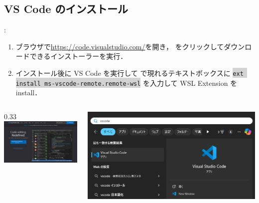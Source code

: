 \documentclass[aspectratio=169,dvipdfmx,cjk]{beamer}
\newcommand{\cmdline}[1]{
    \colorbox{lightgray}{\lstinline[style=command]{#1}}
}
\begin{document}
\subsection{VS Code のインストール}
\begin{frame}{\insertsection \thesubsection: \insertsubsection}
  \begin{enumerate}
    \item ブラウザで\href{https://code.visualstudio.com/}{https://code.visualstudio.com/}を開き， をクリックしてダウンロードできるインストーラーを実行．
    \item インストール後に VS Code を実行して  で現れるテキストボックスに \cmdline{ext install ms-vscode-remote.remote-wsl} を入力して WSL Extension を install．
  \end{enumerate}
  \vspace*{5mm}
  \begin{columns}
    \begin{column}{0.33\textwidth}
        \includegraphics[width=1.0\linewidth]{fig/vscode.png}
    \end{column}
    \begin{column}{0.33\textwidth}
      \includegraphics[width=1.0\linewidth]{fig/start-vscode.png}

\end{column}
\end{columns}
\end{frame}
\end{document}
